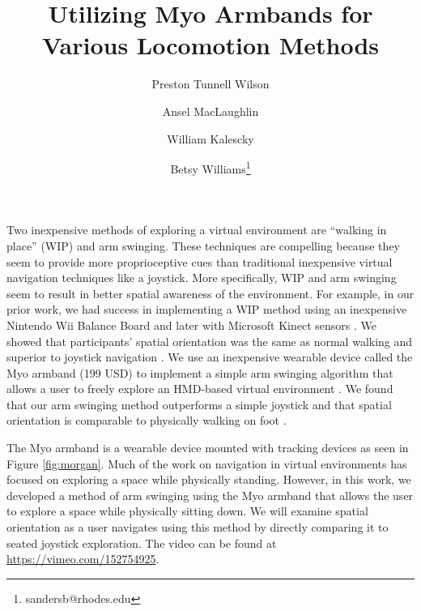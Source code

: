\documentclass{vgtc}                          %
\title{Utilizing Myo Armbands for Various Locomotion Methods}
\author{Preston Tunnell Wilson %
  \and Ansel MacLaughlin %
  \and William Kalescky %
  \and Betsy Williams\thanks{sandersb@rhodes.edu}
}
\affiliation{\scriptsize Rhodes College}
\begin{document}


\maketitle

Two inexpensive methods of exploring a virtual environment are ``walking in place'' (WIP) and arm swinging.
These techniques are compelling because they seem to provide more proprioceptive cues than traditional inexpensive virtual navigation techniques like a joystick.
More specifically, WIP and arm swinging seem to result in better spatial awareness of the environment.
For example, in our prior work, we had success in implementing a WIP method using an inexpensive Nintendo Wii Balance Board \cite{Williams:2011:EWP} and later with Microsoft Kinect sensors \cite{Wilson:2014}.
We showed that participants' spatial orientation was the same as normal walking and superior to joystick navigation \cite{Williams:2011:EWP}.
We use an inexpensive wearable device called the Myo armband (199 USD) to implement a simple arm swinging algorithm that allows a user to freely explore an HMD-based virtual environment \cite{previousMYO}.
We found that our arm swinging method outperforms a simple joystick and that spatial orientation is comparable to physically walking on foot \cite{previousMYO}.


The Myo armband is a wearable device mounted with tracking devices as seen in Figure \ref{fig:morgan}.
Much of the work on navigation in virtual environments has focused on exploring a space while physically standing.
However, in this work, we developed a method of arm swinging using the Myo armband that allows the user to explore a space while physically sitting down.
We will examine spatial orientation as a user navigates using this method by directly comparing it to seated joystick exploration.
The video can be found at \url{https://vimeo.com/152754925}.
\end{document}
